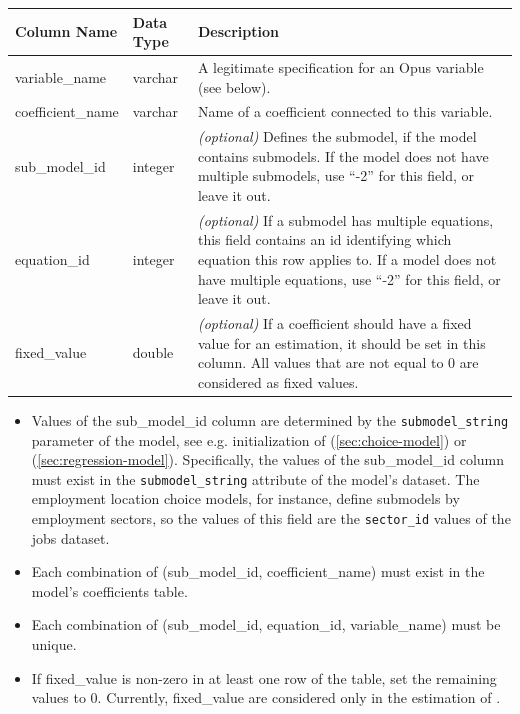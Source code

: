 \begin{tabular}{llp{4.5in}}

\textbf{Column Name} & \textbf{Data Type} & \textbf{Description} \\\hline 
variable_name & varchar & A legitimate specification for an Opus variable (see below).\\\hline 
coefficient_name & varchar & Name of a coefficient connected to this variable.\\\hline
sub_model_id & integer & \emph{(optional)} Defines the submodel, if the model
contains submodels. If the model does not have multiple submodels, use ``-2'' for this field, or leave it out.\\\hline
equation_id & integer & \emph{(optional)} If a submodel has multiple equations, this field
contains an id identifying which equation this row applies to.  If a model does
not have multiple equations, use ``-2'' for this field, or leave it out. \\\hline
fixed_value & double & \emph{(optional)} If a coefficient should have a fixed value for an estimation,
it should be set in this column. All values that are not equal to 0 are considered as fixed values.\\
\hline
\end{tabular}

\begin{itemize} \tight
\item Values of the sub_model_id column are
determined by the \verb|submodel_string| parameter of the model, see e.g. initialization of  
(\ref{sec:choice-model})
or  (\ref{sec:regression-model}). Specifically, the values of the sub_model_id column must 
exist in the \verb|submodel_string| attribute of the model's dataset.
The employment location choice models, for instance, define submodels by
employment sectors, so the values of this field are the
\verb|sector_id| values
of the jobs dataset. 
\item Each combination of (sub_model_id, coefficient_name)
must exist in the model's coefficients table.
\item Each combination of (sub_model_id, equation_id, variable_name) must be unique.
\item If fixed_value is non-zero in at least one row of the table, set the remaining values to 0. Currently, fixed_value 
are considered only in the estimation of .
\end{itemize}

